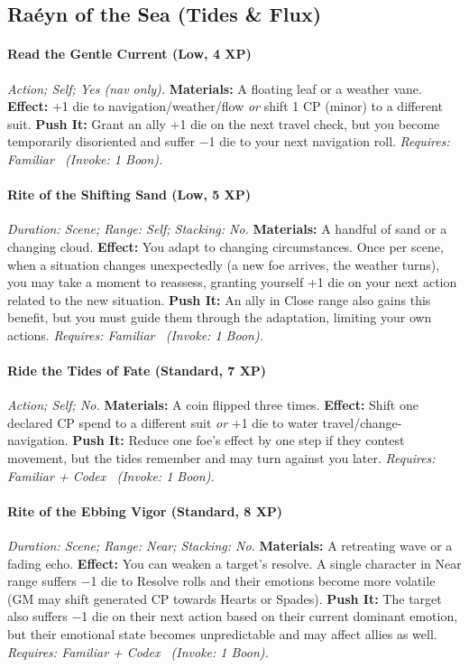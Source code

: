 \subsection{Raéyn of the Sea (Tides \& Flux)}
\paragraph{Read the Gentle Current (Low, 4 XP)} \emph{Action; Self; Yes (nav only).}
\textbf{Materials:} A floating leaf or a weather vane.
\textbf{Effect:} +1 die to navigation/weather/flow \emph{or} shift 1 CP (minor) to a different suit.
\textbf{Push It:} Grant an ally +1 die on the next travel check, but you become temporarily disoriented and suffer −1 die to your next navigation roll.
\emph{Requires: Familiar \ (\textit{Invoke:} 1 Boon).}
\paragraph{Rite of the Shifting Sand (Low, 5 XP)} \emph{Duration: Scene; Range: Self; Stacking: No.}
\textbf{Materials:} A handful of sand or a changing cloud.
\textbf{Effect:} You adapt to changing circumstances. Once per scene, when a situation changes unexpectedly (a new foe arrives, the weather turns), you may take a moment to reassess, granting yourself +1 die on your next action related to the new situation.
\textbf{Push It:} An ally in Close range also gains this benefit, but you must guide them through the adaptation, limiting your own actions.
\emph{Requires: Familiar \ (\textit{Invoke:} 1 Boon).}
\paragraph{Ride the Tides of Fate (Standard, 7 XP)} \emph{Action; Self; No.}
\textbf{Materials:} A coin flipped three times.
\textbf{Effect:} Shift one declared CP spend to a different suit \emph{or} +1 die to water travel/change-navigation.
\textbf{Push It:} Reduce one foe's effect by one step if they contest movement, but the tides remember and may turn against you later.
\emph{Requires: Familiar + Codex \ (\textit{Invoke:} 1 Boon).}
\paragraph{Rite of the Ebbing Vigor (Standard, 8 XP)} \emph{Duration: Scene; Range: Near; Stacking: No.}
\textbf{Materials:} A retreating wave or a fading echo.
\textbf{Effect:} You can weaken a target's resolve. A single character in Near range suffers −1 die to Resolve rolls and their emotions become more volatile (GM may shift generated CP towards Hearts or Spades).
\textbf{Push It:} The target also suffers −1 die on their next action based on their current dominant emotion, but their emotional state becomes unpredictable and may affect allies as well.
\emph{Requires: Familiar + Codex \ (\textit{Invoke:} 1 Boon).}

